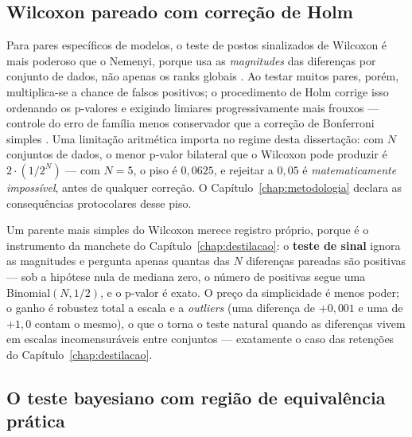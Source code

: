 \subsection{Wilcoxon pareado com correção de Holm}

Para pares específicos
de modelos, o teste de postos sinalizados de Wilcoxon é mais poderoso que o
Nemenyi, porque usa as \emph{magnitudes} das diferenças por conjunto de
dados, não apenas os ranks globais \citep{wilcoxon1945}. Ao testar muitos pares, porém, multiplica-se a
chance de falsos positivos; o procedimento de Holm corrige isso ordenando
os p-valores e exigindo limiares progressivamente mais frouxos ---
controle do erro de família menos conservador que a correção de Bonferroni
simples \citep{holm1979}.
Uma limitação aritmética importa no regime desta dissertação: com $N$
conjuntos de dados, o menor p-valor bilateral que o Wilcoxon pode produzir
é $2 \cdot (1/2^N)$ --- com $N = 5$, o piso é $0{,}0625$, e rejeitar a
$0{,}05$ é \emph{matematicamente impossível}, antes de qualquer correção. O
Capítulo~\ref{chap:metodologia} declara as consequências protocolares desse piso.

Um parente mais simples do Wilcoxon merece registro próprio, porque é
o instrumento da manchete do Capítulo~\ref{chap:destilacao}: o
\textbf{teste de sinal} \citep{conover1999} ignora as magnitudes e
pergunta apenas quantas das $N$ diferenças pareadas são positivas ---
sob a hipótese nula de mediana zero, o número de positivas segue uma
Binomial$(N, 1/2)$, e o p-valor é exato. O preço da simplicidade é
menos poder; o ganho é robustez total a escala e a \emph{outliers}
(uma diferença de $+0{,}001$ e uma de $+1{,}0$ contam o mesmo), o que
o torna o teste natural quando as diferenças vivem em escalas
incomensuráveis entre conjuntos --- exatamente o caso das retenções
do Capítulo~\ref{chap:destilacao}.

\subsection{O teste bayesiano com região de equivalência prática}

